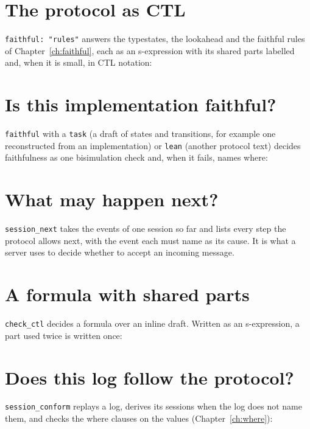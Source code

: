 \section{The protocol as CTL}

\texttt{faithful: "rules"} answers the typestates, the lookahead and the faithful rules
of Chapter~\ref{ch:faithful}, each as an s-expression with its shared parts labelled and,
when it is small, in CTL notation:


\section{Is this implementation faithful?}

\texttt{faithful} with a \texttt{task} (a draft of states and transitions, for example
one reconstructed from an implementation) or \texttt{lean} (another protocol text)
decides faithfulness as one bisimulation check and, when it fails, names where:


\section{What may happen next?}

\texttt{session\_next} takes the events of one session so far and lists every step the
protocol allows next, with the event each must name as its cause. It is what a server
uses to decide whether to accept an incoming message.


\section{A formula with shared parts}

\texttt{check\_ctl} decides a formula over an inline draft. Written as an s-expression,
a part used twice is written once:


\section{Does this log follow the protocol?}

\texttt{session\_conform} replays a log, derives its sessions when the log does not name
them, and checks the where clauses on the values (Chapter~\ref{ch:where}):

